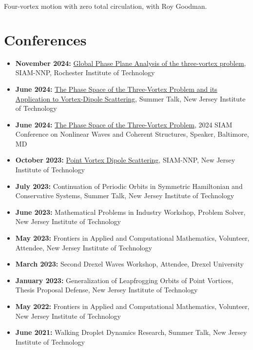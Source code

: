 \documentclass[11pt,a4paper]{article}
\begin{document}
Four-vortex motion with zero total circulation, with Roy Goodman.


\section*{Conferences}
\begin{itemize}[noitemsep]
    \item \textbf{November 2024:} \href{https://siamnnp2024.sciencesconf.org}{Global Phase Plane Analysis of the three-vortex problem}, SIAM-NNP, Rochester Institute of Technology
    \item \textbf{June 2024:} \href{https://math.njit.edu/2024-faculty-and-student-summer-talks}{The Phase Space of the Three-Vortex Problem and its Application to Vortex-Dipole Scattering}, Summer Talk, New Jersey Institute of Technology
    \item \textbf{June 2024:} \href{https://meetings.siam.org/sess/dsp_talk.cfm?p=137268}{The Phase Space of the Three-Vortex Problem}, 2024 SIAM Conference on Nonlinear Waves and Coherent Structures, Speaker, Baltimore, MD


    
   \item \textbf{October 2023:} \href{https://sites.google.com/view/siam-nynjpa/home}{Point Vortex Dipole Scattering}, SIAM-NNP, New Jersey Institute of Technology


    
    \item \textbf{July 2023:} Continuation of Periodic Orbits in Symmetric Hamiltonian and Conservative Systems, Summer Talk, New Jersey Institute of Technology
    \item \textbf{June 2023:} Mathematical Problems in Industry Workshop, Problem Solver, New Jersey Institute of Technology
    \item \textbf{May 2023:} Frontiers in Applied and Computational Mathematics, Volunteer, Attendee, New Jersey Institute of Technology
    \item \textbf{March 2023:} Second Drexel Waves Workshop, Attendee, Drexel University
    \item \textbf{January 2023:} Generalization of Leapfrogging Orbits of Point Vortices, Thesis Proposal Defense, New Jersey Institute of Technology
    \item \textbf{May 2022:} Frontiers in Applied and Computational Mathematics, Volunteer, New Jersey Institute of Technology
    \item \textbf{June 2021:} Walking Droplet Dynamics Research, Summer Talk, New Jersey Institute of Technology
\end{itemize}
\end{document}
